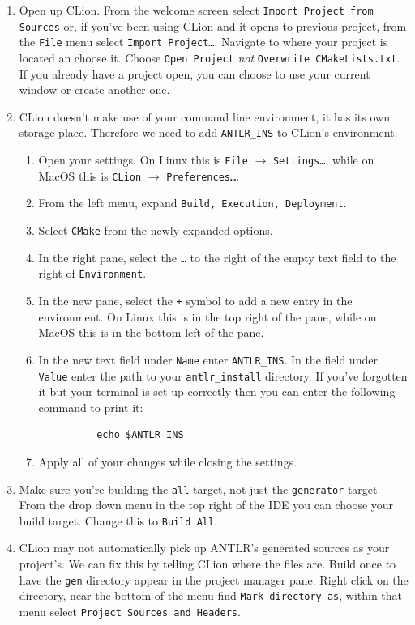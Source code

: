 \documentclass{article}
\newcommand{\code}[1]{\texttt{\textmd{#1}}}
\begin{document}
\begin{enumerate}
  \item
    Open up CLion. From the welcome screen select \texttt{Import Project from Sources} or, if
    you've been using CLion and it opens to previous project, from the \texttt{File} menu select
    \texttt{Import Project\ldots}. Navigate to where your project is located an choose it. Choose
    \texttt{Open Project} \textit{not} \texttt{Overwrite CMakeLists.txt}. If you already have a
    project open, you can choose to use your current window or create another one.
  \item
    CLion doesn't make use of your command line environment, it has its own storage place.
    Therefore we need to add \code{ANTLR\_INS} to CLion's environment.
    \begin{enumerate}
      \item
        Open your settings. On Linux this is \texttt{File} $\rightarrow$ \texttt{Settings\ldots},
        while on MacOS this is \texttt{CLion} $\rightarrow$ \texttt{Preferences\ldots}.
      \item
        From the left menu, expand \texttt{Build, Execution, Deployment}.
      \item
        Select \texttt{CMake} from the newly expanded options.
      \item
        In the right pane, select the \texttt{\ldots} to the right of the empty text field to the
        right of \texttt{Environment}.
      \item
        In the new pane, select the \texttt{+} symbol to add a new entry in the environment. On
        Linux this is in the top right of the pane, while on MacOS this is in the bottom left of
        the pane.
      \item
        In the new text field under \texttt{Name} enter \code{ANTLR\_INS}. In the field under
        \texttt{Value} enter the path to your \code{antlr\_install} directory. If you've forgotten
        it but your terminal is set up correctly then you can enter the following command to print
        it:
        \begin{lstlisting}
          echo $ANTLR_INS
        \end{lstlisting}
      \item
        Apply all of your changes while closing the settings.
    \end{enumerate}
  \item
    Make sure you're building the \texttt{all} target, not just the \texttt{generator} target.
    From the drop down menu in the top right of the IDE you can choose your build target. Change
    this to \texttt{Build All}.
  \item
    CLion may not automatically pick up ANTLR's generated sources as your project's. We can fix
    this by telling CLion where the files are. Build once to have the \code{gen} directory appear
    in the project manager pane. Right click on the directory, near the bottom of the menu find
    \texttt{Mark directory as}, within that menu select \texttt{Project Sources and Headers}.
\end{enumerate}
\end{document}
